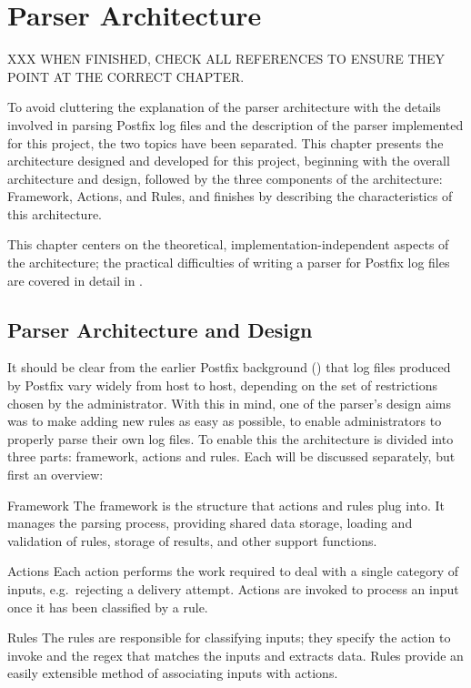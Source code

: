 \chapter{Parser Architecture}

\label{parser architecture}

XXX WHEN FINISHED, CHECK ALL REFERENCES TO ENSURE THEY POINT AT THE CORRECT
CHAPTER\@.

To avoid cluttering the explanation of the parser architecture with the
details involved in parsing Postfix log files and the description of the
parser implemented for this project, the two topics have been separated.
This chapter presents the architecture designed and developed for this
project, beginning with the overall architecture and design, followed by
the three components of the architecture: Framework, Actions, and Rules,
and finishes by describing the characteristics of this architecture.

This chapter centers on the theoretical, implementation-independent aspects
of the architecture; the practical difficulties of writing a parser for
Postfix log files are covered in detail in .

\section{Parser Architecture and Design}

\label{parser design}

It should be clear from the earlier Postfix background () that log files produced by Postfix vary widely from host to
host, depending on the set of restrictions chosen by the administrator.
With this in mind, one of the parser's design aims was to make adding new
rules as easy as possible, to enable administrators to properly parse their
own log files.  To enable this the architecture is divided into three
parts: framework, actions and rules.  Each will be discussed separately,
but first an overview:

\begin{eqlist}

    \item [Framework]  The framework is the structure that actions and
        rules plug into.  It manages the parsing process, providing shared
        data storage, loading and validation of rules, storage of results,
        and other support functions.

    \item [Actions] Each action performs the work required to deal with a
        single category of inputs, e.g.\ rejecting a delivery attempt.
        Actions are invoked to process an input once it has been classified
        by a rule.

    \item [Rules]  The rules are responsible for classifying inputs; they
        specify the action to invoke and the regex that matches the inputs
        and extracts data.  Rules provide an easily extensible method of
        associating inputs with actions.

\end{eqlist}

